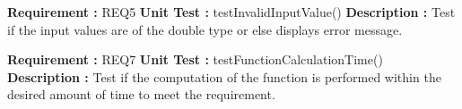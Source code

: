 \documentclass[12pt, a4paper]{article}
\begin{document}
\noindent
\textbf{Requirement : }  REQ5
    \newline
    \textbf{Unit Test : } testInvalidInputValue()
    \newline
    \textbf{Description : } Test if the input values are of the double type or else displays error message.
    \newline
    
\noindent
\textbf{Requirement : }  REQ7
    \newline
    \textbf{Unit Test : } testFunctionCalculationTime()
    \newline
    \textbf{Description : } Test if the computation of the function is performed within the desired amount of time to meet the requirement.
    
\newpage
\end{document}
